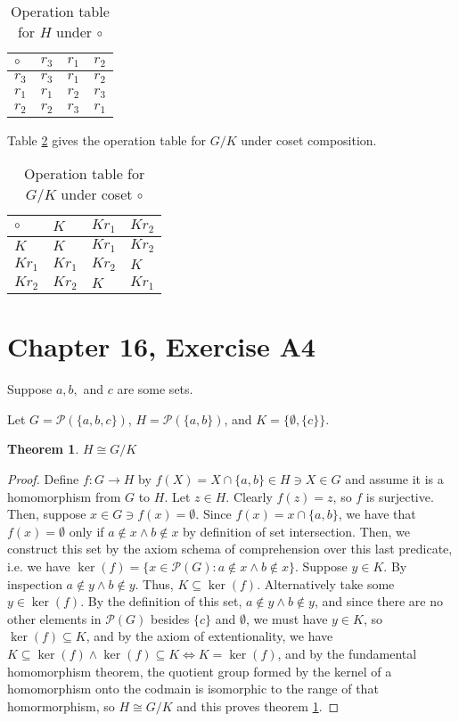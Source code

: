 \documentclass[12pt]{article}
\newcommand{\powset}{\mathcal{P}}
\newtheorem{thm}{Theorem}
\begin{document}
\begin{table}[!ht] 
\begin{tabular}{l|lll}
	$\circ$ & $r_3$ & $r_1$ & $r_2$ \\ \hline
	$r_3$ & $r_3$ & $r_1$ & $r_2$ \\
	$r_1$ & $r_1$ & $r_2$ & $r_3$ \\
	$r_2$ & $r_2$ & $r_3$ & $r_1$
\end{tabular}
\centering
\caption{Operation table for $H$ under $\circ$}
\label{t2}
\end{table}


Table \ref{t3} gives the operation table for $G/K$ under coset composition.

\begin{table}[!ht] 
\begin{tabular}{l|lll}
	$\circ$ & $K$ & $Kr_1$ & $Kr_2$ \\ \hline
	$K$ & $K$ & $Kr_1$ & $Kr_2$ \\
	$Kr_1$ & $Kr_1$ & $Kr_2$ & $K$ \\
	$Kr_2$ & $Kr_2$ & $K$ & $Kr_1$
\end{tabular}
\centering
\caption{Operation table for $G/K$ under coset $\circ$}
\label{t3}
\end{table}

\section{Chapter 16, Exercise A4}

Suppose $a, b,$ and $c$ are some sets.

Let $G = \powset(\{a,b,c\})$, $H = \powset(\{a,b\})$, and $K = \{ \emptyset, \{ c \}\}$.

\begin{thm} \label{thm2}
	$H \cong G/K$
\end{thm}

\begin{proof}
	Define $f:G \to H$ by $f(X) = X \cap \{ a,b\} \in H \ni X \in G$
	and assume it is a homomorphism from $G$ to $H$.
	Let $z \in H$. Clearly $f(z) = z$, so $f$ is surjective.
	Then, suppose $x \in G \ni f(x) = \emptyset$.
	Since $f(x) = x \cap \{a,b\}$, we have that $f(x) = \emptyset$
	only if $a \not\in x \land b \not\in x$ by definition of set intersection.
	Then, we construct this set by the axiom schema of comprehension over
	this last predicate, i.e. we have $\ker(f)  = \{x \in \powset(G): a \not\in x \land b \not\in x\}$.
	Suppose $y \in K$. By inspection $a \not\in y \land b \not\in y$.
	Thus, $K \subseteq \ker(f)$. Alternatively take some $y \in \ker(f)$.
	By the definition of this set, $a \not\in y \land b \not\in y$, and since
	there are no other elements in $\powset(G)$ besides $\{c\}$ and $\emptyset$,
	we must have $y \in K$, so $\ker(f) \subseteq K$, and by the axiom of extentionality,
	we have $K \subseteq \ker(f) \land \ker(f) \subseteq K \iff K = \ker(f)$,
	and by the fundamental homomorphism theorem, the quotient group formed by the kernel
	of a homomorphism onto the codmain is isomorphic to the range of that homormorphism,
	so $H \cong G/K$ and this proves theorem \ref{thm2}.
\end{proof}
\end{document}
